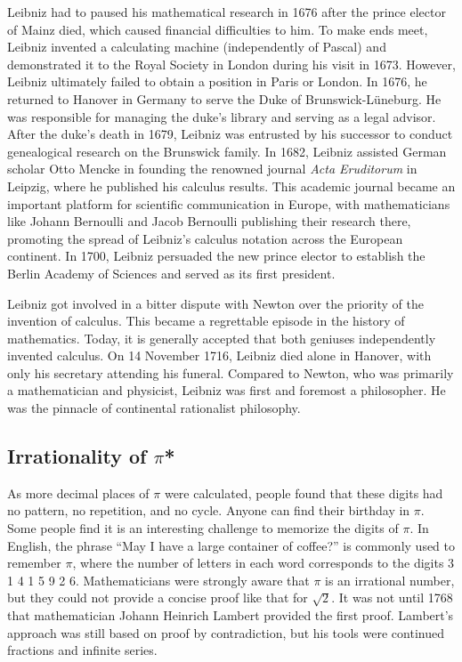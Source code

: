 \documentclass[b5paper]{article}
\begin{document}
\begin{mdframed}
Leibniz had to paused his mathematical research in 1676 after the prince elector of Mainz died, which caused financial difficulties to him. To make ends meet, Leibniz invented a calculating machine (independently of Pascal) and demonstrated it to the Royal Society in London during his visit in 1673. However, Leibniz ultimately failed to obtain a position in Paris or London. In 1676, he returned to Hanover in Germany to serve the Duke of Brunswick-Lüneburg. He was responsible for managing the duke's library and serving as a legal advisor. After the duke's death in 1679, Leibniz was entrusted by his successor to conduct genealogical research on the Brunswick family. In 1682, Leibniz assisted German scholar Otto Mencke in founding the renowned journal \emph{Acta Eruditorum} in Leipzig, where he published his calculus results. This academic journal became an important platform for scientific communication in Europe, with mathematicians like Johann Bernoulli and Jacob Bernoulli publishing their research there, promoting the spread of Leibniz's calculus notation across the European continent. In 1700, Leibniz persuaded the new prince elector to establish the Berlin Academy of Sciences and served as its first president.

Leibniz got involved in a bitter dispute with Newton over the priority of the invention of calculus. This became a regrettable episode in the history of mathematics. Today, it is generally accepted that both geniuses independently invented calculus. On 14 November 1716, Leibniz died alone in Hanover, with only his secretary attending his funeral. Compared to Newton, who was primarily a mathematician and physicist, Leibniz was first and foremost a philosopher. He was the pinnacle of continental rationalist philosophy.
\end{mdframed}

\subsection{Irrationality of \texorpdfstring{$\pi$}{π}*}

As more decimal places of $\pi$ were calculated, people found that these digits had no pattern, no repetition, and no cycle. Anyone can find their birthday in $\pi$. Some people find it is an interesting challenge to memorize the digits of $\pi$. In English, the phrase \enquote{May I have a large container of coffee?} is commonly used to remember $\pi$, where the number of letters in each word corresponds to the digits 3 1 4 1 5 9 2 6. Mathematicians were strongly aware that $\pi$ is an irrational number, but they could not provide a concise proof like that for $\sqrt{2}$. It was not until 1768 that mathematician Johann Heinrich Lambert provided the first proof. Lambert's approach was still based on proof by contradiction, but his tools were continued fractions and infinite series.
\end{document}

